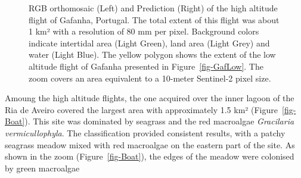 \documentclass[
  number]{elsarticle}
\begin{document}
\label{cell-fig-GafHigh}
\begin{figure}[H]


\caption{\label{fig-GafHigh}RGB orthomosaic (Left) and Prediction
(Right) of the high altitude flight of Gafanha, Portugal. The total
extent of this flight was about 1 km² with a resolution of 80 mm per
pixel. Background colors indicate intertidal area (Light Green), land
area (Light Grey) and water (Light Blue). The yellow polygon shows the
extent of the low altitude flight of Gafanha presented in
Figure~\ref{fig-GafLow}. The zoom covers an area equivalent to a
10-meter Sentinel-2 pixel size.}

\end{figure}%

Amoung the high altitude flights, the one acquired over the inner lagoon
of the Ria de Aveiro covered the largest area with approximately 1.5 km²
(Figure~\ref{fig-Boat}). This site was dominated by seagrass and the red
macroalgae \emph{Gracilaria vermicullophyla}. The classification
provided consistent results, with a patchy seagrass meadow mixed with
red macroalgae on the eastern part of the site. As shown in the zoom
(Figure~\ref{fig-Boat}), the edges of the meadow were colonised by green
macroalgae
\end{document}
